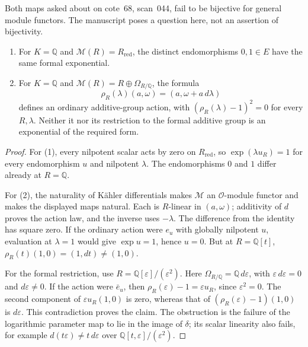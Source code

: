 \begin{proposition}
\label{C:functor-counterexamples}
Both maps asked about on cote~68, scan~044, fail to be bijective for general module functors. The manuscript poses a question here, not an assertion of bijectivity.
\begin{enumerate}
\item For $K=\mathbb Q$ and $\mathcal M(R)=R_{\mathrm{red}}$, the distinct endomorphisms $0,1\in E$ have the same formal exponential.
\item For $K=\mathbb Q$ and $\mathcal M(R)=R\oplus\Omega_{R/\mathbb Q}$, the formula
\[
\rho_R(\lambda)(a,\omega)=(a,\omega+a\,d\lambda)
\]
defines an ordinary additive-group action, with $(\rho_R(\lambda)-1)^2=0$ for every $R,\lambda$. Neither it nor its restriction to the formal additive group is an exponential of the required form.
\end{enumerate}
\end{proposition}
\begin{proof}
For (1), every nilpotent scalar acts by zero on $R_{\mathrm{red}}$, so $\exp(\lambda u_R)=1$ for every endomorphism $u$ and nilpotent $\lambda$. The endomorphisms $0$ and $1$ differ already at $R=\mathbb Q$.

For (2), the naturality of K\"ahler differentials makes $\mathcal M$ an $\mathcal O$-module functor and makes the displayed maps natural. Each is $R$-linear in $(a,\omega)$; additivity of $d$ proves the action law, and the inverse uses $-\lambda$. The difference from the identity has square zero. If the ordinary action were $e_u$ with globally nilpotent $u$, evaluation at $\lambda=1$ would give $\exp u=1$, hence $u=0$. But at $R=\mathbb Q[t]$, $\rho_R(t)(1,0)=(1,dt)\ne(1,0)$.

For the formal restriction, use $R=\mathbb Q[\varepsilon]/(\varepsilon^2)$. Here $\Omega_{R/\mathbb Q}=\mathbb Q\,d\varepsilon$, with $\varepsilon\,d\varepsilon=0$ and $d\varepsilon\ne0$. If the action were $\bar e_u$, then
$\rho_R(\varepsilon)-1=\varepsilon u_R$, since $\varepsilon^2=0$. The second component of $\varepsilon u_R(1,0)$ is zero, whereas that of $(\rho_R(\varepsilon)-1)(1,0)$ is $d\varepsilon$. This contradiction proves the claim. The obstruction is the failure of the logarithmic parameter map to lie in the image of $\delta$; its scalar linearity also fails, for example $d(t\varepsilon)\ne t\,d\varepsilon$ over $\mathbb Q[t,\varepsilon]/(\varepsilon^2)$.
\end{proof}

